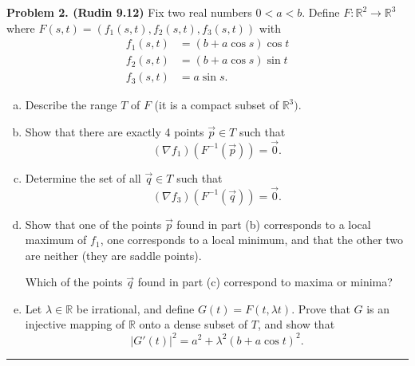 \documentclass[leqno]{article}
\theoremstyle{nonumberplain}
\newcommand{\R}{\mathbb{R}}
\begin{document}
\pagebreak



\noindent\textbf{Problem 2. (Rudin 9.12)} Fix two real numbers $0<a<b$. Define $F\colon \R^2 \to \R^3$ where $F(s,t)=(f_1(s,t),f_2(s,t),f_3(s,t))$ with
\begin{align*}
f_1(s,t)&=(b+a\cos s) \cos t\\
f_2(s,t)&=(b+a \cos s) \sin t\\
f_3(s,t)&=a \sin s.
\end{align*}

\begin{enumerate}[(a)]
\item Describe the range $T$ of $F$ (it is a compact subset of $\R^3)$.
\item Show that there are exactly 4 points $\vec{p}\in T$ such that
\[
(\nabla f_1) (F^{-1}(\vec{p}))=\vec{0}.
\]
\item Determine the set of all $\vec{q}\in T$ such that
\[
(\nabla f_3)(F^{-1}(\vec{q}))=\vec{0}.
\]
\item Show that one of the points $\vec{p}$ found in part (b) corresponds to a local maximum of $f_1$, one corresponds to a local minimum, and that the other two are neither (they are saddle points).

\noindent Which of the points $\vec{q}$ found in part (c) correspond to maxima or minima?
\item Let $\lambda \in \R$ be irrational, and define $G(t)=F(t,\lambda t)$. Prove that $G$ is an injective mapping of $\R$ onto a dense subset of $T$, and show that 
\[
|G'(t)|^2=a^2+\lambda^2 (b+a\cos t)^2.
\]
\end{enumerate}

\noindent\rule[0.5ex]{\linewidth}{1pt}
\end{document}
